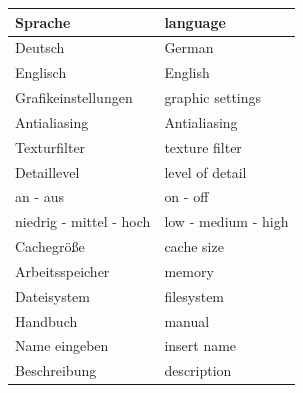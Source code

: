 \documentclass[10pt]{scrreprt}
\begin{document}
\begin{longtable}{|p{7.5cm}|p{7.5cm}|}
\hline
\rule[-1ex]{0pt}{4ex} Sprache & language \\
\hline
\rule[-1ex]{0pt}{4ex} Deutsch & German \\
\hline
\rule[-1ex]{0pt}{4ex} Englisch & English \\
\hline
\rule[-1ex]{0pt}{4ex} Grafikeinstellungen & graphic settings \\
\hline
\rule[-1ex]{0pt}{4ex} Antialiasing & Antialiasing \\
\hline
\rule[-1ex]{0pt}{4ex} Texturfilter & texture filter \\
\hline
\rule[-1ex]{0pt}{4ex} Detaillevel & level of detail \\
\hline
\rule[-1ex]{0pt}{4ex} an - aus & on - off \\
\hline
\rule[-1ex]{0pt}{4ex} niedrig - mittel - hoch & low - medium - high\\
\hline
\rule[-1ex]{0pt}{4ex} Cachegröße & cache size \\
\hline
\rule[-1ex]{0pt}{4ex} Arbeitsspeicher & memory \\
\hline
\rule[-1ex]{0pt}{4ex} Dateisystem & filesystem \\
\hline
\rule[-1ex]{0pt}{4ex} Handbuch & manual \\
\hline
\rule[-1ex]{0pt}{4ex} Name eingeben & insert name \\
\hline
\rule[-1ex]{0pt}{4ex} Beschreibung & description \\
\hline
\end{longtable}

\vspace{1.5cm}
\end{document}

